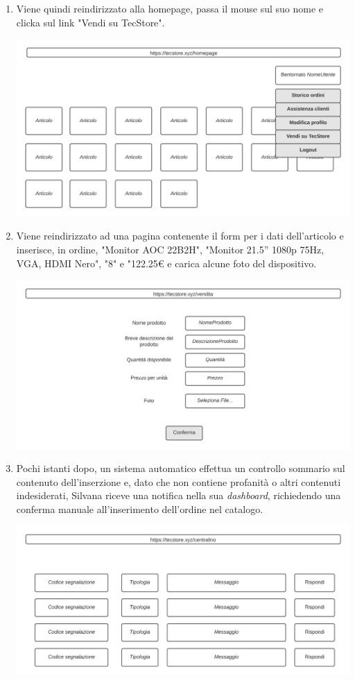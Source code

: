 \documentclass[12pt,a4paper]{article}
\begin{document}
\begin{enumerate}
\newpage

\item Viene quindi reindirizzato alla homepage, passa il mouse sul suo nome e clicka sul link "Vendi su TecStore".

\includegraphics[width=\textwidth]{homepage_login}

\item Viene reindirizzato ad una pagina contenente il form per i dati dell'articolo e inserisce, in ordine, "Monitor AOC 22B2H", "Monitor 21.5'' 1080p 75Hz, VGA, HDMI Nero", "8" e "122.25€ e carica alcune foto del dispositivo.

\includegraphics[width=\textwidth]{vendita}

\newpage
\item Pochi istanti dopo, un sistema automatico effettua un controllo sommario sul contenuto dell'inserzione e, dato che non contiene profanità o altri contenuti indesiderati, Silvana riceve una notifica nella sua \textit{dashboard}, richiedendo una conferma manuale all'inserimento dell'ordine nel catalogo.

\includegraphics[width=\textwidth]{centralino}


\end{enumerate}
\end{document}
